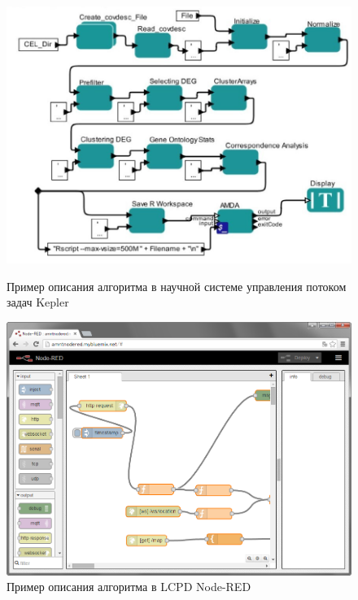 \begin{frame}
  \begin{figure}
    \begin{minipage}{0.49\textwidth}
      \centering
      \includegraphics[width=\textwidth]{images/screenshot.KeplerWorkflow.jpg}
      \caption{\smaller[1] Пример описания алгоритма в научной системе управления потоком задач Kepler}
    \end{minipage}\hfill\begin{minipage}{0.49\textwidth}
      \centering
      \includegraphics[width=\textwidth]{images/screenshot.NodeRED.png}
      \caption{\smaller[1] Пример описания алгоритма в LCPD Node-RED}
    \end{minipage}\hfill
  \end{figure}
\end{frame}

